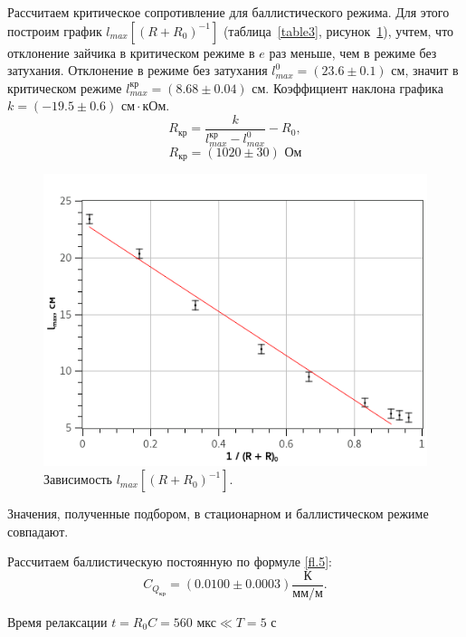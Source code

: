 \documentclass{article}
\begin{document}
   Рассчитаем критическое сопротивление для баллистического режима. Для этого построим график $l_{max}\left[ (R + R_0)^{-1} \right]$ (таблица~\ref{table3}, рисунок~\ref{plot.3}), учтем, что отклонение зайчика в критическом режиме в $e$ раз меньше, чем в режиме без затухания. Отклонение в режиме без затухания $l_{max}^0 = (23.6  \pm 0.1)\text{ см}$, значит в критическом режиме $l_{max}^\text{кр} = (8.68 \pm 0.04)\text{ см}$. Коэффициент наклона графика $k = (-19.5 \pm 0.6)\text{ см}\cdot\text{кОм}$.
   \[
       R_\text{кр} = \frac{k}{l_{max}^\text{кр} - l_{max}^0} - R_0, 
   \] 
   \[
      R_\text{кр} = (1020 \pm 30) \text{ Ом}
   \]
   
   
   \begin{figure}[h]
   \centering
   \includegraphics[width=12cm]{plot3.png} 
   \caption{Зависимость $l_{max}\left[ (R + R_0)^{-1} \right]$.} 
   \label{plot.3} 
   \end{figure}

   Значения, полученные подбором, в стационарном и баллистическом режиме совпадают.

   Рассчитаем баллистическую постоянную по формуле \eqref{fl.5}:
   \[
      C_{Q_\text{кр}} = (0.0100 \pm 0.0003) \frac{\text{К}}{\text{мм} / \text{м}}.
   \]

   Время релаксации $ t = R_0 C = 560 \text{ мкс} \ll T = 5 \text{ с}$
\end{document}
